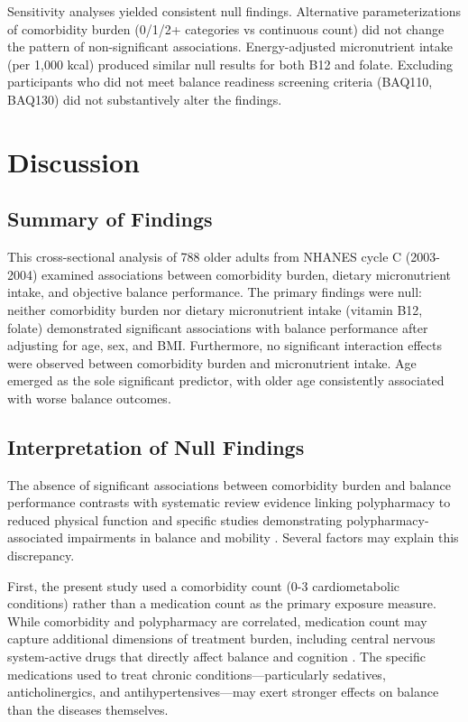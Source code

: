 \documentclass[11pt,a4paper]{article}
\begin{document}
Sensitivity analyses yielded consistent null findings. Alternative parameterizations of comorbidity burden (0/1/2+ categories vs continuous count) did not change the pattern of non-significant associations. Energy-adjusted micronutrient intake (per 1,000 kcal) produced similar null results for both B12 and folate. Excluding participants who did not meet balance readiness screening criteria (BAQ110, BAQ130) did not substantively alter the findings.

\section{Discussion}

\subsection{Summary of Findings}

This cross-sectional analysis of 788 older adults from NHANES cycle C (2003-2004) examined associations between comorbidity burden, dietary micronutrient intake, and objective balance performance. The primary findings were null: neither comorbidity burden nor dietary micronutrient intake (vitamin B12, folate) demonstrated significant associations with balance performance after adjusting for age, sex, and BMI. Furthermore, no significant interaction effects were observed between comorbidity burden and micronutrient intake. Age emerged as the sole significant predictor, with older age consistently associated with worse balance outcomes.

\subsection{Interpretation of Null Findings}

The absence of significant associations between comorbidity burden and balance performance contrasts with systematic review evidence linking polypharmacy to reduced physical function \cite{katsimpris2019_polypharmacy_function_review} and specific studies demonstrating polypharmacy-associated impairments in balance and mobility \cite{salkin2025_polypharmacy_balance, abubakar2021_polypharmacy_falls}. Several factors may explain this discrepancy.

First, the present study used a comorbidity count (0-3 cardiometabolic conditions) rather than a medication count as the primary exposure measure. While comorbidity and polypharmacy are correlated, medication count may capture additional dimensions of treatment burden, including central nervous system-active drugs that directly affect balance and cognition \cite{romandemettelinge2013_diabetes_falls_medications}. The specific medications used to treat chronic conditions—particularly sedatives, anticholinergics, and antihypertensives—may exert stronger effects on balance than the diseases themselves.
\end{document}
